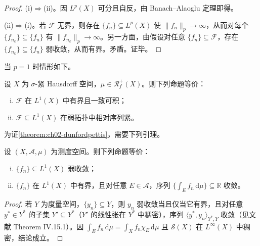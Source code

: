 \documentclass[../../main.tex]{subfiles}%
\begin{document}
\begin{proof}
(i)$\Rightarrow$(ii)。因 $L^p(X)$ 可分且自反，由 Banach--Alaoglu 定理即得。

(ii)$\Rightarrow$(i)。若 $\mathscr F$ 无界，则存在 $\{f_n\}\subseteq L^p(X)$ 使 $\|f_n\|_p\to\infty$，从而对每个 $\{f_{n_k}\}\subseteq\{f_n\}$ 有 $\|f_{n_k}\|_p\to\infty$。另一方面，由假设对任意 $\{f_n\}\subseteq\mathscr F$，存在 $\{f_{n_k}\}\subseteq\{f_n\}$ 弱收敛，从而有界。矛盾。证毕。
\end{proof}

当 $p=1$ 时情形如下。

\begin{theorem}\label{theorem:ch02-dunfordpettis}
设 $X$ 为 $\sigma$-紧 Hausdorff 空间，$\mu\in\mathscr R^+_f(X)$。则下列命题等价：
\begin{enumerate}[(i)]
\item $\mathscr F$ 在 $L^1(X)$ 中有界且一致可积；
\item $\mathscr F\subseteq L^1(X)$ 在弱拓扑中相对序列紧。
\end{enumerate}
\end{theorem}

为证\cref{theorem:ch02-dunfordpettis}，需要下列引理。

\begin{lemma}\label{lemma:ch02-弱收敛判据}
设 $(X,\mathscr A,\mu)$ 为测度空间。则下列命题等价：
\begin{enumerate}[(i)]
\item $\{f_n\}\subseteq L^1(X)$ 弱收敛；
\item $\{f_n\}$ 在 $L^1(X)$ 中有界，且对任意 $E\in\mathscr A$，序列 $\{\int_E f_n\,\mathrm{d}\mu\}\subseteq\mathbb R$ 收敛。
\end{enumerate}
\end{lemma}

\begin{proof}
若 $Y$ 为度量空间，$\{y_n\}\subseteq Y$，则 $y_n$ 弱收敛当且仅当它有界，且对任意 $y^*\in Y^*$ 的子集 $Y'\subseteq Y^*$（$Y'$ 的线性张在 $Y^*$ 中稠密），序列 $\langle y^*,y_n\rangle_{Y^*,Y}$ 收敛（见文献\cite{ref66} Theorem IV.15.1）。因 $\int_E f_n\,\mathrm{d}\mu=\int_X f_n\chi_E\,\mathrm{d}\mu$ 且 $\mathscr S(X)$ 在 $L^\infty(X)$ 中稠密，结论成立。
\end{proof}
\end{document}
